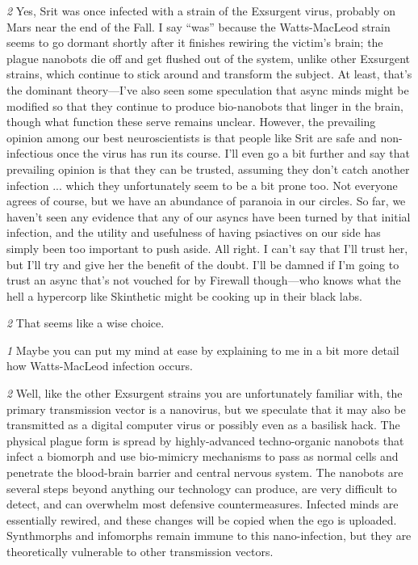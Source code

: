 \textit{\textit{2}} Yes, Srit was once infected with a strain of the Exsurgent virus, probably on Mars near the end of the Fall. I say “was” because the Watts-MacLeod strain seems to go dormant shortly after it finishes rewiring the victim’s brain; the plague nanobots die off and get flushed out of the system, unlike other Exsurgent strains, which continue to stick around and transform the subject. At least, that’s the dominant theory—I’ve also seen some speculation that async minds might be modified so that they continue to produce bio-nanobots that linger in the brain, though what function these serve remains unclear. However, the prevailing opinion among our best neuroscientists is that people like Srit are safe and non-infectious once the virus has run its course. I’ll even go a bit further and say that prevailing opinion is that they can be trusted, assuming they don’t catch another infection ... which they unfortunately seem to be a bit prone too. Not everyone agrees of course, but we have an abundance of paranoia in our circles. So far, we haven’t seen any evidence that any of our asyncs have been turned by that initial infection, and the utility and usefulness of having psiactives on our side has simply been too important to push aside. All right. I can’t say that I’ll trust her, but I’ll try and give her the benefit of the doubt. I’ll be damned if I’m going to trust an async that’s not vouched for by Firewall though—who knows what the hell a hypercorp like Skinthetic might be cooking up in their black labs. 

\textit{\textit{2}} That seems like a wise choice. 

\textit{\textit{1}} Maybe you can put my mind at ease by explaining to me in a bit more detail how Watts-MacLeod infection occurs. 

\textit{\textit{2}} Well, like the other Exsurgent strains you are unfortunately familiar with, the primary transmission vector is a nanovirus, but we speculate that it may also be transmitted as a digital computer virus or possibly even as a basilisk hack. The physical plague form is spread by highly-advanced techno-organic nanobots that infect a biomorph and use bio-mimicry mechanisms to pass as normal cells and penetrate the blood-brain barrier and central nervous system. The nanobots are several steps beyond anything our technology can produce, are very difficult to detect, and can overwhelm most defensive countermeasures. Infected minds are essentially rewired, and these changes will be copied when the ego is uploaded. Synthmorphs and infomorphs remain immune to this nano-infection, but they are theoretically vulnerable to other transmission vectors. 

